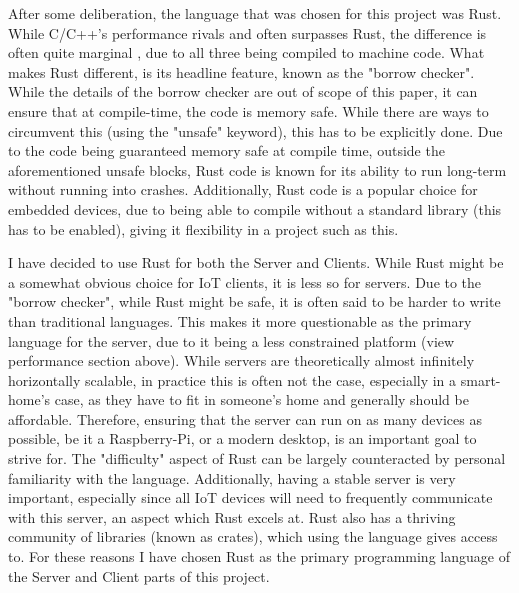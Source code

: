 After some deliberation, the language that was chosen for this project was Rust. While C/C++'s performance rivals and often surpasses Rust, the difference is often quite marginal \cite{PerformanceEvalOnMicrocontroller}, due to all three being compiled to machine code. What makes Rust different, is its headline feature, known as the "borrow checker". While the details of the borrow checker are out of scope of this paper, it can ensure that at compile-time, the code is memory safe. While there are ways to circumvent this (using the "unsafe" keyword), this has to be explicitly done. Due to the code being guaranteed memory safe at compile time, outside the aforementioned unsafe blocks, Rust code is known for its ability to run long-term without running into crashes. Additionally, Rust code is a popular choice for embedded devices, due to being able to compile without a standard library (this has to be enabled), giving it flexibility in a project such as this.

I have decided to use Rust for both the Server and Clients. While Rust might be a somewhat obvious choice for IoT clients, it is less so for servers. Due to the "borrow checker", while Rust might be safe, it is often said to be harder to write than traditional languages. This makes it more questionable as the primary language for the server, due to it being a less constrained platform (view performance section above). While servers are theoretically almost infinitely horizontally scalable, in practice this is often not the case, especially in a smart-home's case, as they have to fit in someone's home and generally should be affordable. Therefore, ensuring that the server can run on as many devices as possible, be it a Raspberry-Pi, or a modern desktop, is an important goal to strive for. The "difficulty" aspect of Rust can be largely counteracted by personal familiarity with the language. Additionally, having a stable server is very important, especially since all IoT devices will need to frequently communicate with this server, an aspect which Rust excels at. Rust also has a thriving community of libraries (known as crates), which using the language gives access to. For these reasons I have chosen Rust as the primary programming language of the Server and Client parts of this project.

